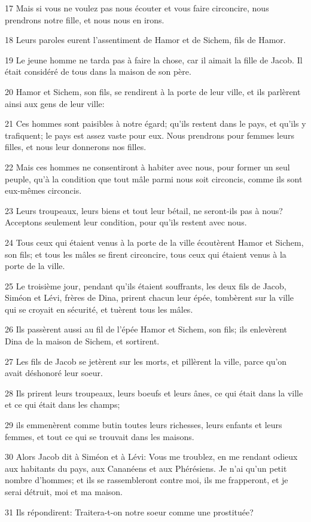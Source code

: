 \par 17 Mais si vous ne voulez pas nous écouter et vous faire circoncire, nous prendrons notre fille, et nous nous en irons.
\par 18 Leurs paroles eurent l'assentiment de Hamor et de Sichem, fils de Hamor.
\par 19 Le jeune homme ne tarda pas à faire la chose, car il aimait la fille de Jacob. Il était considéré de tous dans la maison de son père.
\par 20 Hamor et Sichem, son fils, se rendirent à la porte de leur ville, et ils parlèrent ainsi aux gens de leur ville:
\par 21 Ces hommes sont paisibles à notre égard; qu'ils restent dans le pays, et qu'ils y trafiquent; le pays est assez vaste pour eux. Nous prendrons pour femmes leurs filles, et nous leur donnerons nos filles.
\par 22 Mais ces hommes ne consentiront à habiter avec nous, pour former un seul peuple, qu'à la condition que tout mâle parmi nous soit circoncis, comme ils sont eux-mêmes circoncis.
\par 23 Leurs troupeaux, leurs biens et tout leur bétail, ne seront-ils pas à nous? Acceptons seulement leur condition, pour qu'ils restent avec nous.
\par 24 Tous ceux qui étaient venus à la porte de la ville écoutèrent Hamor et Sichem, son fils; et tous les mâles se firent circoncire, tous ceux qui étaient venus à la porte de la ville.
\par 25 Le troisième jour, pendant qu'ils étaient souffrants, les deux fils de Jacob, Siméon et Lévi, frères de Dina, prirent chacun leur épée, tombèrent sur la ville qui se croyait en sécurité, et tuèrent tous les mâles.
\par 26 Ils passèrent aussi au fil de l'épée Hamor et Sichem, son fils; ils enlevèrent Dina de la maison de Sichem, et sortirent.
\par 27 Les fils de Jacob se jetèrent sur les morts, et pillèrent la ville, parce qu'on avait déshonoré leur soeur.
\par 28 Ils prirent leurs troupeaux, leurs boeufs et leurs ânes, ce qui était dans la ville et ce qui était dans les champs;
\par 29 ils emmenèrent comme butin toutes leurs richesses, leurs enfants et leurs femmes, et tout ce qui se trouvait dans les maisons.
\par 30 Alors Jacob dit à Siméon et à Lévi: Vous me troublez, en me rendant odieux aux habitants du pays, aux Cananéens et aux Phérésiens. Je n'ai qu'un petit nombre d'hommes; et ils se rassembleront contre moi, ils me frapperont, et je serai détruit, moi et ma maison.
\par 31 Ils répondirent: Traitera-t-on notre soeur comme une prostituée?

